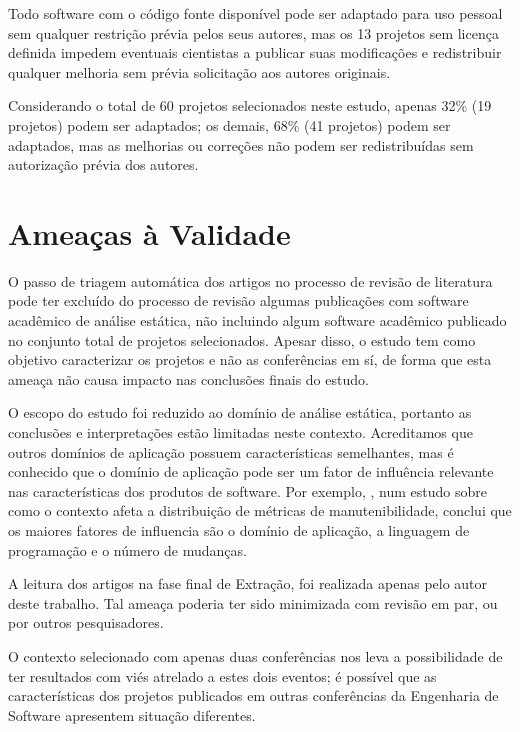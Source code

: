 Todo software com o código fonte disponível pode ser adaptado para uso pessoal
sem qualquer restrição prévia pelos seus autores, mas os 13 projetos sem
licença definida impedem eventuais cientistas a publicar suas modificações e
redistribuir qualquer melhoria sem prévia solicitação aos autores originais.

Considerando o total de 60 projetos selecionados neste estudo, apenas 32\% (19
projetos) podem ser adaptados; os demais, 68\% (41 projetos) podem ser
adaptados, mas as melhorias ou correções não podem ser redistribuídas sem
autorização prévia dos autores.


\section{Ameaças à Validade} %

O passo de triagem automática dos artigos no processo de revisão de literatura
pode ter excluído do processo de revisão algumas publicações com software
acadêmico de análise estática, 
não incluindo algum software acadêmico publicado no conjunto total de projetos
selecionados. Apesar disso, o estudo tem como objetivo
caracterizar os projetos e não as conferências em sí, de forma que esta ameaça
não causa impacto nas conclusões finais do estudo.

O escopo do estudo foi reduzido ao domínio de análise estática, portanto as
conclusões e interpretações estão limitadas neste contexto. Acreditamos que
outros domínios de aplicação possuem características semelhantes, mas é
conhecido que o domínio de aplicação pode ser um fator de influência relevante nas
características dos produtos de software.
Por exemplo, , num estudo sobre como o contexto afeta
a distribuição de métricas de manutenibilidade, conclui que os maiores fatores
de influencia são o domínio de aplicação, a linguagem de programação e o número
de mudanças.

A leitura dos artigos na fase final de Extração, foi realizada
apenas pelo autor deste trabalho. Tal ameaça poderia ter sido minimizada com
revisão em par, ou por outros pesquisadores.

O contexto selecionado com apenas duas conferências nos leva a possibilidade de
ter resultados com viés atrelado a estes dois eventos; é possível que as
características dos projetos publicados em outras conferências da Engenharia de
Software apresentem situação diferentes.


